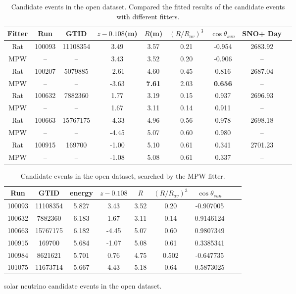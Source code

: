 \begin{table}[ht]
	\centering
	\caption{Candidate events in the open dataset. Compared the fitted results of the candidate events with different fitters.}
	\label{opendata}
	\begin{tabular*}{150mm}{c@{\extracolsep{\fill}}cccccccc}
		\toprule
		Fitter &	Run &  GTID &  $z-0.108$(m) & $R$(m)& $(R/R_{av})^3$ & $\cos\theta_{sun}$ & SNO+ Day\\
		\hline 
		Rat & 100093 &11108354 &3.49 &3.57 &0.21 &-0.954 &2683.92 \\	
		MPW &  --& --& 3.43 &	3.52 &	0.20	& -0.906 & --\\
		Rat &	100207 &5079885 &-2.61 &4.60 &0.45 &0.816 &2687.04\\
		MPW &	 --& --& -3.63 & \textbf{7.61} &	2.03 & \textbf{0.656} & -- \\
		Rat &100632 &7882360 &1.77 &3.19 &0.15 &0.937 &2696.93\\
		MPW &    --& --&  1.67 & 3.11 &	0.14 & 0.911 & -- \\
		Rat &100663 &15767175 &-4.33& 4.96 &0.56 &0.978 &2698.18\\
		MPW & --& -- &-4.45 &	5.07 &	0.60 &	0.980 & -- \\
		Rat &100915 &169700 &-1.00 &5.10 &0.61 &0.341 &2701.23\\
		MPW &	--& --& -1.08 &	5.08 &	0.61 &	0.337 & -- \\	
		\bottomrule
	\end{tabular*}
\end{table}

\begin{table}[ht]
	\centering
	\caption{Candidate events in the open dataset, searched by the MPW fitter.}
	\label{opendataMPW}
	\begin{tabular*}{150mm}{c@{\extracolsep{\fill}}cccccccc}
		\toprule
		Run & GTID & energy & $z-0.108$ & $R$ & $(R/R_{av})^3$ & $\cos\theta_{sun}$\\
		\hline 
		100093 &	11108354	&5.827 & 3.43 & 3.52 & 0.20 & -0.907005\\
		100632&	7882360    &6.183& 1.67 &3.11 &0.14 &0.9146124\\
		100663&	15767175   &	6.182 & -4.45 &5.07 &0.60&	0.9807349\\
		100915&	169700   &	5.684 &	-1.07 &5.08 &0.61&0.3385341\\
		100984&	8621621&	5.701 & 0.76 &4.75 &0.502&-0.647735\\
		101075&	11673714&	5.667 &4.43 &5.18 &0.64& 0.5873025\\
		
		\bottomrule
	\end{tabular*}
\end{table}
solar neutrino candidate events in the open dataset.

